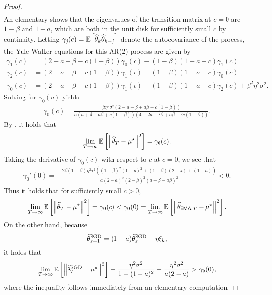 \begin{proof}
\begin{align}
    \end{align}
    An elementary shows that the eigenvalues of the transition matrix at $c=0$ are $1 - \beta$ and $1 - a$, which are both in the unit disk for sufficiently small $c$ by continuity.  Letting $\gamma_j(c) = \ee\left[ \thetahat_k \thetahat_{k - j} \right]$ denote the autocovariance of the process, the Yule-Walker equations for this AR(2) process  are given by
    \begin{align}
        \gamma_1(c) &= \left( 2 - a - \beta - c(1 - \beta) \right) \gamma_0(c) - \left( 1 - \beta \right)(1 - a - c) \gamma_1(c) \\
        \gamma_2(c) &= \left( 2 - a - \beta - c(1 - \beta) \right) \gamma_1(c) - \left( 1 - \beta \right)(1 - a - c) \gamma_0(c) \\
        \gamma_0(c) &= \left( 2 - a - \beta - c(1 - \beta) \right) \gamma_1(c) - \left( 1 - \beta \right)(1 - a - c) \gamma_2(c) + \beta^2 \eta^2 \sigma^2.
    \end{align}
    Solving for $\gamma_0(c)$ yields
    \begin{align}\label{eq:gamma_0}
        \gamma_0(c) = \frac{\beta \eta^2 \sigma^2 \left( 2 - a - \beta + a \beta - c (1 - \beta) \right)}{a \left( a + \beta - a \beta + c (1 - \beta) \right)\left( 4 - 2a - 2 \beta + a \beta - 2 c (1 - \beta) \right)}.
    \end{align}
    By , it holds that
    \begin{align}
        \lim_{T \to \infty} \ee\left[ \norm{\thetahat_T - \mustar}^2 \right] = \gamma_0(c).
    \end{align}
    Taking the derivative of $\gamma_0(c)$ with respect to $c$ at $c = 0$, we see that
    \begin{align}
        \gamma_0'(0) = - \frac{2 \beta(1 - \beta) \eta^2 \sigma^2 \left( (1 - \beta)^2 (1 - a)^2 + (1 - \beta)(2 - a) + (1 - a) \right)}{a(2-a)^2(2-\beta)^2(a + \beta - a \beta)^2} < 0.
    \end{align}
    Thus it holds that for sufficiently small $c > 0$,
    \begin{align}
        \lim_{T \to \infty} \ee\left[ \norm{\thetahat_T - \mustar}^2 \right] = \gamma_0(c) < \gamma_0(0) = \lim_{T \to \infty} \ee\left[ \norm{\thetema[T] - \mustar}^2 \right].
    \end{align}
    On the other hand, because
    \begin{align}
        \thetasgd_{k+1} = (1 - a) \thetasgd_k - \eta \xi_k,
    \end{align}
    it holds that
    \begin{align}
        \lim_{T \to \infty} \ee\left[ \norm{\thetasgd_T - \mustar}^2 \right] = \frac{\eta^2 \sigma^2}{1 - (1 - a)^2} = \frac{\eta^2 \sigma^2}{a(2 - a)} > \gamma_0(0),
    \end{align}
    where the inequality follows immediately from an elementary computation.
\end{proof}




